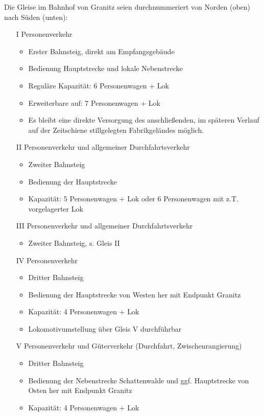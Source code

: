 Die Gleise im Bahnhof von Granitz seien durchnummeriert von Norden (oben) nach S\"uden (unten):
\begin{itemize}
	\item[I] Personenverkehr
	\begin{itemize}
		\item Erster Bahnsteig, direkt am Empfangsgeb\"aude
		\item Bedienung Hauptstrecke und lokale Nebenstrecke
		\item Regul\"are Kapazit\"at: 6 Personenwagen + Lok
		\item Erweiterbare auf: 7 Personenwagen + Lok
		\item Es bleibt eine direkte Versorgung des anschlie{\ss}enden, im sp\"ateren Verlauf auf der Zeitschiene stillgelegten Fabrikgel\"andes m\"oglich.
	\end{itemize}
	\item[II] Personenverkehr und allgemeiner Durchfahrtsverkehr
	\begin{itemize}
		\item Zweiter Bahnsteig
		\item Bedienung der Hauptstrecke
		\item Kapazit\"at: 5 Personenwagen + Lok oder 6 Personenwagen mit z.T. vorgelagerter Lok
	\end{itemize}
	\item[III] Personenverkehr und allgemeiner Durchfahrtsverkehr
	\begin{itemize}
		\item Zweiter Bahnsteig, s. Gleis II
	\end{itemize}
	\item[IV] Personenverkehr
	\begin{itemize}
		\item Dritter Bahnsteig
		\item Bedienung der Hauptstrecke von Westen her mit Endpunkt Granitz
		\item Kapazit\"at: 4 Personenwagen + Lok
		\item Lokomotivumstellung \"uber Gleis V durchf\"uhrbar
	\end{itemize}
	\item[V] Personenverkehr und G\"uterverkehr (Durchfahrt, Zwischenrangierung)
	\begin{itemize}
		\item Dritter Bahnsteig
		\item Bedienung der Nebenstrecke Schattenwalde und ggf. Hauptstrecke von Osten her mit Endpunkt Granitz
		\item Kapazit\"at: 4 Personenwagen + Lok

\end{itemize}
\end{itemize}
